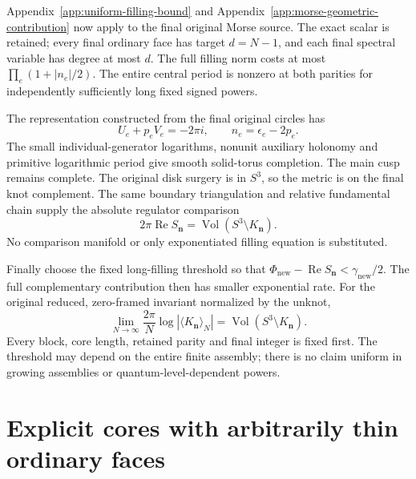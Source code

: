Appendix~\ref{app:uniform-filling-bound} and Appendix~\ref{app:morse-geometric-contribution} now apply to the final original Morse source. The exact scalar is retained; every final ordinary face has target \(d=N-1\), and each final spectral variable has degree at most \(d\). The full filling norm costs at most
\(\prod_e(1+|n_e|/2)\). The entire central period is nonzero at both parities for independently sufficiently long fixed signed powers.

The representation constructed from the final original circles has
\begin{equation}\label{tbi:eq-25}
U_e+p_eV_e=-2\pi i,\qquad n_e=\epsilon_e-2p_e.
\end{equation}
The small individual-generator logarithms, nonunit auxiliary holonomy and primitive logarithmic period give smooth solid-torus completion. The main cusp remains complete. The original disk surgery is in \(S^3\), so the metric is on the final knot complement. The same boundary triangulation and relative fundamental chain supply the absolute regulator comparison
\begin{equation}\label{tbi:eq-26}
2\pi\operatorname{Re}S_{\boldsymbol n}
=\operatorname{Vol}(S^3\setminus K_{\boldsymbol n}).
\end{equation}
No comparison manifold or only exponentiated filling equation is substituted.

Finally choose the fixed long-filling threshold so that
\(\Phi_{\mathrm{new}}-\operatorname{Re}S_{\boldsymbol n}
<\gamma_{\mathrm{new}}/2\). The full complementary contribution then has smaller exponential rate. For the original reduced, zero-framed invariant normalized by the unknot,
\begin{equation}\label{tbi:eq-27}
\lim_{N\to\infty}\frac{2\pi}{N}
\log\left|\langle K_{\boldsymbol n}\rangle_N\right|
=\operatorname{Vol}(S^3\setminus K_{\boldsymbol n}).
\end{equation}
Every block, core length, retained parity and final integer is fixed first. The threshold may depend on the entire finite assembly; there is no claim uniform in growing assemblies or quantum-level-dependent powers.

\section{Explicit cores with arbitrarily thin ordinary faces}\label{tbi:sec-8}


